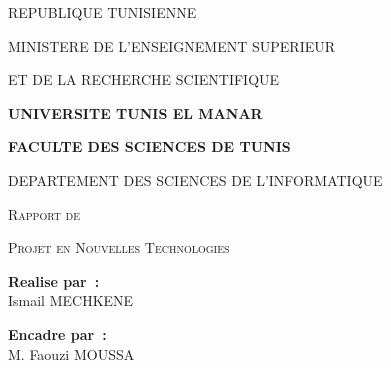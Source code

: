 \documentclass[a4paper,12pt,oneside]{report}
\begin{document}
\begin{titlepage}
\centering
\thispagestyle{empty}

{\large REPUBLIQUE TUNISIENNE\par}
{\large MINISTERE DE L'ENSEIGNEMENT SUPERIEUR\par}
{\large ET DE LA RECHERCHE SCIENTIFIQUE\par}
\vspace{0.3cm}
{\Large\bfseries UNIVERSITE TUNIS EL MANAR\par}
\vspace{0.6cm}


\vspace{0.3cm}
{\Large\bfseries FACULTE DES SCIENCES DE TUNIS\par}
{\large DEPARTEMENT DES SCIENCES DE L'INFORMATIQUE\par}

\vspace{2cm}

{\Large\scshape Rapport de\par}
{\Large\scshape Projet en Nouvelles Technologies\par}

\vspace{1.5cm}


\vspace{2cm}

\begin{minipage}{0.48\textwidth}
\begin{flushleft}
\textbf{Realise par~:}\\[4pt]
Ismail MECHKENE
\end{flushleft}
\end{minipage}
\begin{minipage}{0.48\textwidth}
\begin{flushright}
\textbf{Encadre par~:}\\[4pt]
M. Faouzi MOUSSA
\end{flushright}
\end{minipage}


\end{titlepage}
\end{document}
